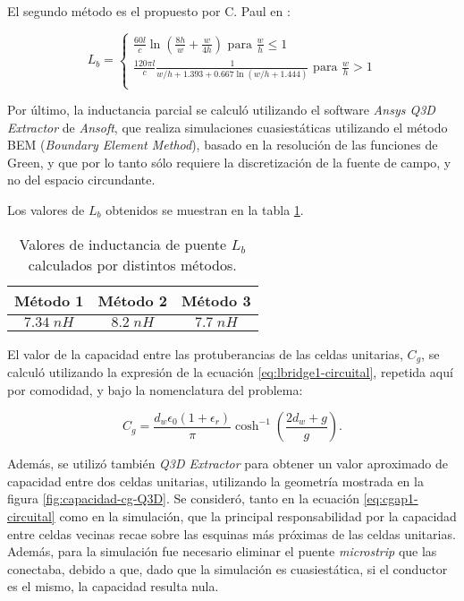 El segundo método es el propuesto por C. Paul en \cite{CPaul:InductanceLoopAndPartial}:

\begin{equation}
\label{eq:lbridge2-circuital-cpaul}
L_{b} = \begin{cases}
			\frac{60 l}{c} \ln \left( \frac{8h}{w} + \frac{w}{4h} \right) \text{ para } \frac{w}{h}\leq 1\\
			\frac{120 \pi l}{c} \frac{1}{w/h+1.393+0.667\ln(w/h+1.444)} \text{ para } \frac{w}{h} > 1 \\
		\end{cases}
\end{equation}

Por último, la inductancia parcial se calculó utilizando el software \textit{Ansys Q3D Extractor} de \textit{Ansoft}, que realiza simulaciones cuasiestáticas utilizando el método BEM (\textit{Boundary Element Method}), basado en la resolución de las funciones de Green, y que por lo tanto sólo requiere la discretización de la fuente de campo, y no del espacio circundante.

Los valores de $L_b$ obtenidos se muestran en la tabla \ref{table:Lb}.

\begin{table}
	\centering
	\begin{tabular}{|c|c|c|}
		\hline 
		Método 1 & Método 2 & Método 3\\ 
		\hline 
		$7.34\;nH$ & $8.2\;nH$ & $7.7\;nH$\\ 
		\hline 
	\end{tabular}
	\caption{Valores de inductancia de puente $L_b$ calculados por distintos métodos.}
	\label{table:Lb}
\end{table}

El valor de la capacidad entre las protuberancias de las celdas unitarias, $C_g$, se calculó utilizando la expresión de la ecuación \ref{eq:lbridge1-circuital}, repetida aquí por comodidad, y bajo la nomenclatura del problema:

\begin{equation}
\label{eq:cgap1-circuital}
C_{g} = \frac{d_w\epsilon_0(1+\epsilon_r)}{\pi}\cosh^{-1}\left(\frac{2 d_w + g}{g}\right).
\end{equation}

Además, se utilizó también \textit{Q3D Extractor} para obtener un valor aproximado de capacidad entre dos celdas unitarias, utilizando la geometría mostrada en la figura \ref{fig:capacidad-cg-Q3D}. Se consideró, tanto en la ecuación \ref{eq:cgap1-circuital} como en la simulación, que la principal responsabilidad por la capacidad entre celdas vecinas recae sobre las esquinas más próximas de las celdas unitarias. Además, para la simulación fue necesario eliminar el puente \textit{microstrip} que las conectaba, debido a que, dado que la simulación es cuasiestática, si el conductor es el mismo, la capacidad resulta nula.

